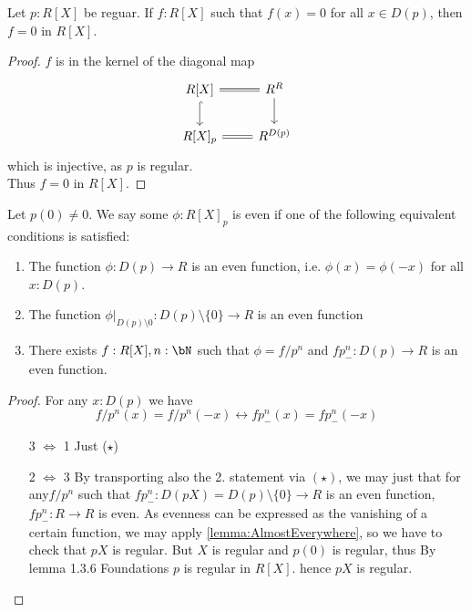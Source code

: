 \begin{lemma}{\label{lemma:AlmostEverywhere}}
	Let $p : R[X]$ be reguar. If $f : R[X]$ such that $f(x) = 0$ for all $x \in D(p)$, then $f = 0$ in $R[X]$.
\end{lemma}
\begin{proof}
	$f$ is in the kernel of the diagonal map
	\[\begin{tikzcd}
		{R[X]} & {R^R} \\
		{R[X]_p} & {R^{D(p)}}
		\arrow[hook, from=1-1, to=2-1]
		\arrow[Rightarrow, no head, from=1-2, to=1-1]
		\arrow[from=1-2, to=2-2]
		\arrow[Rightarrow, no head, from=2-2, to=2-1]
	\end{tikzcd}\]
	which is injective, as $p$ is regular. \\
	Thus $f = 0$ in $R[X]$.
\end{proof}
\begin{lemma}
	Let $p(0) \neq 0$. We say some $\phi: R[X]_p$ is even if one of the following equivalent conditions is satisfied:
	\begin{enumerate}
		
		\item The function $\phi : D(p) \to R$ is an even function, i.e. $\phi(x) = \phi(-x)$ for all $ x : D(p)$.
		\item The function $\phi|_{D(p) \setminus 0} : D(p) \setminus \{0\} \to R$ is an even function
		\item  There exists $f : R[X], n : \bN$ such that $\phi= f/ p^n$ and $f p_-^n : D(p) \to R$ is an even function. 
	\end{enumerate}
\end{lemma}
\begin{proof}
	For any $x : D(p)$ we have 
	\[
	f/p^n (x) = f/p^n(-x)  \leftrightarrow f p_-^n (x) = f p_-^n (-x) \tag{$\star$}
	\]
	\begin{enumerate}
		\item [3 $\Leftrightarrow$ 1] Just ($\star$)
		\item [2 $\Leftrightarrow$ 3] By transporting also the 2. statement via $(\star)$, we may just that for any$ f / p^n$ such that $f p_-^n : D(p X) = D(p) \setminus \{0\} \to R$ is an even function, $f p_-^n : R \to R$ is even. As evenness can be expressed as the vanishing of a certain function, we may apply \ref{lemma:AlmostEverywhere}, so we have to check that $p X$  is regular. But $X$ is regular and $p(0)$ is regular, thus By lemma 1.3.6 Foundations \todocite $p$ is regular in $R[X]$. hence $p X$ is regular. %
	\end{enumerate}
\end{proof}

